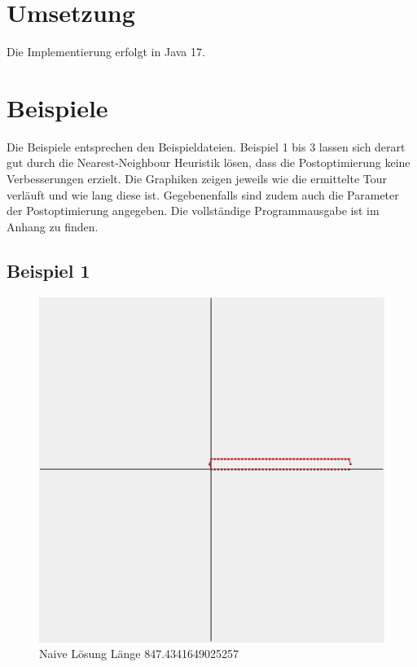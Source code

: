 \section{Umsetzung}\label{sec:umsetzung}
Die Implementierung erfolgt in Java 17.


\section{Beispiele}\label{sec:beispiele}
Die Beispiele entsprechen den Beispieldateien.
Beispiel 1 bis 3 lassen sich derart gut durch die Nearest-Neighbour Heuristik lösen, dass die Postoptimierung keine Verbesserungen erzielt.
Die Graphiken zeigen jeweils wie die ermittelte Tour verläuft und wie lang diese ist.
Gegebenenfalls sind zudem auch die Parameter der Postoptimierung angegeben.
Die vollständige Programmausgabe ist im Anhang zu finden.

\subsection{Beispiel 1}\label{subsec:beispiel-1}
\begin{figure}[h]
    \centering
    \begin{minipage}[b]{0.6\textwidth}
        \includegraphics[width=\textwidth]{naivwenigerkrumm1}
        \caption{Naive Lösung Länge 847.4341649025257}
    \end{minipage}\label{fig:wenigerkrumm1}
\end{figure}
\FloatBarrier

